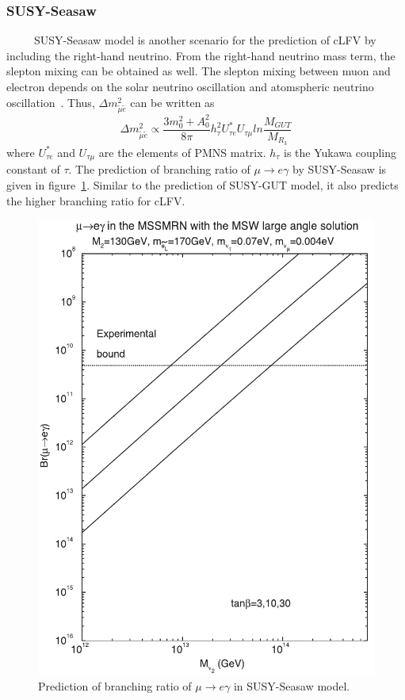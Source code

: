 \subsubsection{SUSY-Seasaw}
~~~~~SUSY-Seasaw model is another scenario for the prediction of cLFV by including the right-hand neutrino.
From the right-hand neutrino mass term, the slepton mixing can be obtained as well.
The slepton mixing between muon and electron depends on the solar neutrino oscillation and atomspheric neutrino oscillation~\cite{hisano}.
Thus, $\Delta m_{\tilde{\mu}\tilde{e}}^2$ can be written as
\begin{equation}
 \Delta m_{\tilde{\mu}\tilde{e}}^2 \propto \frac{3m_0^2+A_0^2}{8\pi}h_\tau^2U_{\tau e}^*U_{\tau\mu}ln\frac{M_{GUT}}{M_{R_3}}
\end{equation}
where $U_{\tau e}^*$ and $U_{\tau\mu}$ are the elements of PMNS matrix.
$h_\tau$ is the Yukawa coupling constant of $\tau$.
The prediction of branching ratio of $\mu \rightarrow e\gamma$ by SUSY-Seasaw is given in figure~\ref{susyseasaw}.
Similar to the prediction of SUSY-GUT model, it also predicts the higher branching ratio for cLFV.
\begin{figure}[H]
 \centering
 \includegraphics[scale=0.6]{chapter1/fig/susyseasaw.pdf}
 \caption{Prediction of branching ratio of $\mu \rightarrow e\gamma$ in SUSY-Seasaw model.}
 \label{susyseasaw}
\end{figure}

